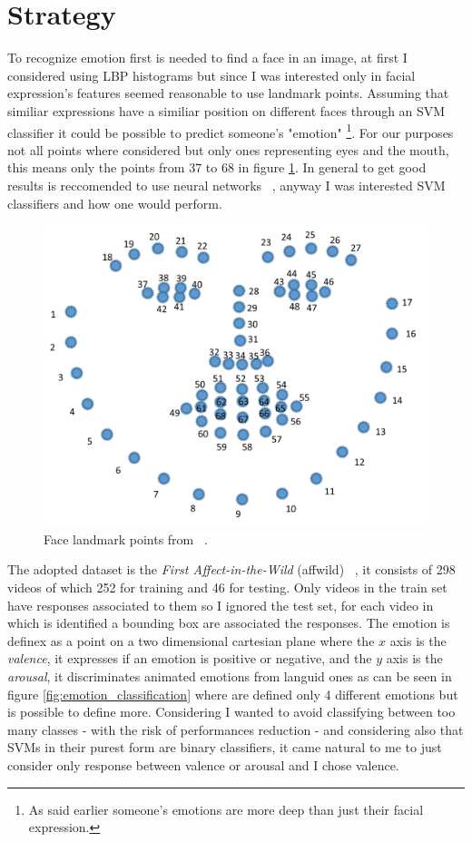 \section{Strategy}
To recognize emotion first is needed to find a face in an image, at first I considered using LBP histograms but since I was interested only in facial expression's features seemed reasonable to use landmark points. 
Assuming that similiar expressions have a similiar position on different faces through an SVM classifier it could be possible to predict someone's "emotion" \footnote{As said earlier someone's emotions are more deep than just their facial expression.}.
For our purposes not all points where considered but only ones representing eyes and the mouth, this means only the points from 37 to 68 in figure \ref{fig:landmarks}.
In general to get good results is reccomended to use neural networks ~\cite{blog:emotion}, anyway I was interested SVM classifiers and how one would perform.

\begin{figure}
    \centering
    \includegraphics[scale=0.2]{images/landmark.png}
    \caption{Face landmark points from ~\cite{landmark:guide}.}
    \label{fig:landmarks}
\end{figure}

The adopted dataset is the \textit{First Affect-in-the-Wild} (affwild) ~\cite{dataset:affwild}, it consists of 298 videos of which 252 for training and 46 for testing.
Only videos in the train set have responses associated to them so I ignored the test set, for each video in which is identified a bounding box are associated the responses.
The emotion is definex as a point on a two dimensional cartesian plane where the $x$ axis is the \textit{valence}, it expresses if an emotion is positive or negative, and the $y$ axis is the \textit{arousal}, it discriminates animated emotions from languid ones as can be seen in figure \ref{fig:emotion_classification} where are defined only 4 different emotions but is possible to define more.
Considering I wanted to avoid classifying between too many classes -  with the risk of performances reduction - and considering also that SVMs in their purest form are binary classifiers, it came natural to me to just consider only response between valence or arousal and I chose valence.

